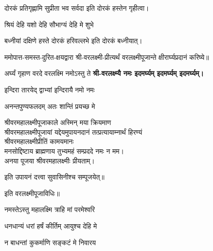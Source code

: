 \begin{center}
{दोरकं प्रतिगृह्णामि सुप्रीता भव सर्वदा} 
इति दोरकं हस्तेन गृहीत्वा।


{श्रियं देहि यशो देहि सौभाग्यं देहि मे शुभे}

{बध्नीयां दक्षिणे हस्ते दोरकं हरिवल्लभे}
इति दोरकं बध्नीयात्।


ममोपात्त-समस्त-दुरित-क्षयद्वारा श्री-वरलक्ष्मी-प्रीत्यर्थं वरलक्ष्मीपूजान्ते क्षीरार्घ्यप्रदानं करिष्ये॥

{अर्घ्यं गृहाण वरदे वरलक्ष्मि नमोऽस्तु ते} 
\textbf{श्री-वरलक्ष्म्यै नमः इदमर्घ्यम् इदमर्घ्यम् इदमर्घ्यम्।}


{इन्दिरा तारयेद् द्वाभ्यां इन्दिरायै नमो नमः}

{अनन्तपुण्यफलदम् अतः शान्तिं प्रयच्छ मे}

श्रीवरमहालक्ष्मीपूजाकाले अस्मिन् मया क्रियमाण\\
श्रीवरमहालक्ष्मीपूजायां यद्देयमुपायनदानं तत्प्रत्यायाम्नार्थं हिरण्यं\\
श्रीवरमहालक्ष्मीप्रीतिं कामयमानः\\
मनसोद्दिष्टाय ब्राह्मणाय तुभ्यमहं सम्प्रददे नमः न मम।\\ 
अनया पूजया श्रीवरमहालक्ष्मीः प्रीयताम्। 

इति उपायनं दत्त्वा सुवासिनीश्च सम्पूजयेत्॥


इति वरलक्ष्मीपूजाविधिः॥

\end{center}





{नमस्तेऽस्तु महालक्ष्मि त्राहि मां परमेश्वरि}

{धनधान्यं धरां हर्षं कीर्तिम् आयुश्च देहि मे}

{न बाधन्तां कुकर्माणि सङ्कटं मे निवारय}





